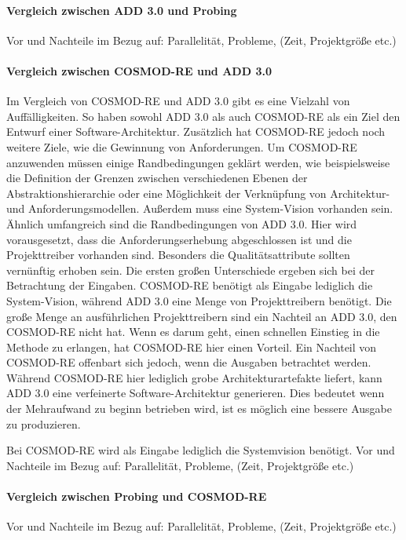 \paragraph{Vergleich zwischen ADD 3.0 und Probing}
Vor und Nachteile im Bezug auf: Parallelität, Probleme, (Zeit, Projektgröße etc.)\\

\paragraph{Vergleich zwischen COSMOD-RE und ADD 3.0}
Im Vergleich von COSMOD-RE und ADD 3.0 gibt es eine Vielzahl von Auffälligkeiten. So haben sowohl ADD 3.0 als auch COSMOD-RE als ein Ziel den Entwurf einer Software-Architektur. Zusätzlich hat COSMOD-RE jedoch noch weitere Ziele, wie die Gewinnung von Anforderungen. Um COSMOD-RE anzuwenden müssen einige Randbedingungen geklärt werden, wie beispielsweise die Definition der Grenzen zwischen verschiedenen Ebenen der Abstraktionshierarchie oder eine Möglichkeit der Verknüpfung von Architektur- und Anforderungsmodellen. Außerdem muss eine System-Vision vorhanden sein. Ähnlich umfangreich sind die Randbedingungen von ADD 3.0. Hier wird vorausgesetzt, dass die Anforderungserhebung abgeschlossen ist und die Projekttreiber vorhanden sind. Besonders die Qualitätsattribute sollten vernünftig erhoben sein. Die ersten großen Unterschiede ergeben sich bei der Betrachtung der Eingaben. COSMOD-RE benötigt als Eingabe lediglich die System-Vision, während ADD 3.0 eine Menge von Projekttreibern benötigt. Die große Menge an ausführlichen Projekttreibern sind ein Nachteil an ADD 3.0, den COSMOD-RE nicht hat. Wenn es darum geht, einen schnellen Einstieg in die Methode zu erlangen, hat COSMOD-RE hier einen Vorteil. Ein Nachteil von COSMOD-RE offenbart sich jedoch, wenn die Ausgaben betrachtet werden. Während COSMOD-RE hier lediglich grobe Architekturartefakte liefert, kann ADD 3.0 eine verfeinerte Software-Architektur generieren. Dies bedeutet wenn der Mehraufwand zu beginn betrieben wird, ist es möglich eine bessere Ausgabe zu produzieren.

Bei COSMOD-RE wird als Eingabe lediglich die Systemvision benötigt.
Vor und Nachteile im Bezug auf: Parallelität, Probleme, (Zeit, Projektgröße etc.)\\

\paragraph{Vergleich zwischen Probing und  COSMOD-RE}
Vor und Nachteile im Bezug auf: Parallelität, Probleme, (Zeit, Projektgröße etc.)\\